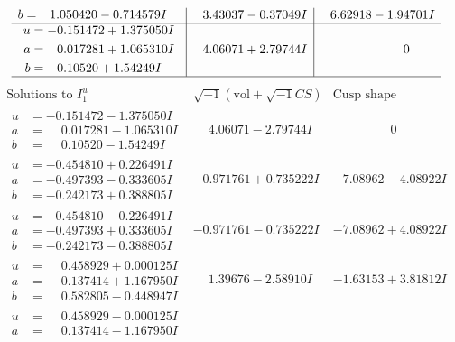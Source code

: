 \documentclass[1p]{elsarticle_modified}
\theoremstyle{definition}
\newcommand{\I}{\sqrt{-1}}
\begin{document}
$$\begin{array}{c|c|c}
\begin{aligned}
b &= \phantom{-}1.050420 - 0.714579 I\end{aligned}
 & \phantom{-}3.43037 - 0.37049 I & \phantom{-}6.62918 - 1.94701 I \\ \hline\begin{aligned}
u &= -0.151472 + 1.375050 I \\
a &= \phantom{-}0.017281 + 1.065310 I \\
b &= \phantom{-}0.10520 + 1.54249 I\end{aligned}
 & \phantom{-}4.06071 + 2.79744 I & \phantom{-0.000000 } 0\\
 \hline 
 \end{array}$$\newpage$$\begin{array}{c|c|c}  
\text{Solutions to }I^u_{1}& \I (\text{vol} + \sqrt{-1}CS) & \text{Cusp shape}\\
 \hline 
\begin{aligned}
u &= -0.151472 - 1.375050 I \\
a &= \phantom{-}0.017281 - 1.065310 I \\
b &= \phantom{-}0.10520 - 1.54249 I\end{aligned}
 & \phantom{-}4.06071 - 2.79744 I & \phantom{-0.000000 } 0 \\ \hline\begin{aligned}
u &= -0.454810 + 0.226491 I \\
a &= -0.497393 - 0.333605 I \\
b &= -0.242173 + 0.388805 I\end{aligned}
 & -0.971761 + 0.735222 I & -7.08962 - 4.08922 I \\ \hline\begin{aligned}
u &= -0.454810 - 0.226491 I \\
a &= -0.497393 + 0.333605 I \\
b &= -0.242173 - 0.388805 I\end{aligned}
 & -0.971761 - 0.735222 I & -7.08962 + 4.08922 I \\ \hline\begin{aligned}
u &= \phantom{-}0.458929 + 0.000125 I \\
a &= \phantom{-}0.137414 + 1.167950 I \\
b &= \phantom{-}0.582805 - 0.448947 I\end{aligned}
 & \phantom{-}1.39676 - 2.58910 I & -1.63153 + 3.81812 I \\ \hline\begin{aligned}
u &= \phantom{-}0.458929 - 0.000125 I \\
a &= \phantom{-}0.137414 - 1.167950 I \\

\end{aligned}
\end{array}$$
\end{document}
